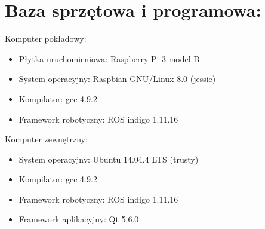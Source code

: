 \documentclass[a4paper]{article}
\begin{document}
\section{ Baza sprzętowa i programowa:}
Komputer pokładowy:
\begin{itemize}
\item Płytka uruchomieniowa: Raspberry Pi 3 model B
\item System operacyjny:     Raspbian GNU/Linux 8.0 (jessie)
\item Kompilator:            gcc 4.9.2
\item Framework robotyczny:  ROS indigo 1.11.16
\end{itemize}

\newpage

Komputer zewnętrzny:
\begin{itemize}
\item System operacyjny:     Ubuntu 14.04.4 LTS (trusty)
\item Kompilator:            gcc 4.9.2
\item Framework robotyczny:  ROS indigo 1.11.16
\item Framework aplikacyjny: Qt 5.6.0
\end{itemize}
\end{document}
